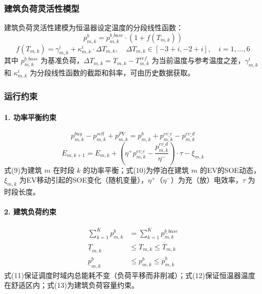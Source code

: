 \documentclass[11pt]{ctexart}
\begin{document}
\subsubsection{建筑负荷灵活性模型}

建筑负荷灵活性建模为恒温器设定温度的分段线性函数：
\begin{equation}
    p_{m,k}^b = p_{m,k}^{b\_base} \cdot (1 + f(T_{m,k}))
\end{equation}
\begin{equation}
    f(T_{m,k}) = \gamma_{m,k}^i + \kappa_{m,k}^i \cdot \Delta T_{m,k}, \quad \Delta T_{m,k} \in [-3+i, -2+i], \quad i=1,...,6
\end{equation}
其中 $p_{m,k}^{b\_base}$ 为基准负荷，$\Delta T_{m,k} = T_{m,k} - T_{m,k}^{ref}$ 为当前温度与参考温度之差，$\gamma_{m,k}^i$ 和 $\kappa_{m,k}^i$ 为分段线性函数的截距和斜率，可由历史数据获取。

\subsubsection{运行约束}

\paragraph{1. 功率平衡约束}
\begin{equation}
    p_{m,k}^{buy} - p_{m,k}^{sell} + p_{m,k}^{PV} = p_{m,k}^b + p_{m,k}^{ev\_c} - p_{m,k}^{ev\_d}
\end{equation}
\begin{equation}
    E_{m,k+1} = E_{m,k} + (\eta^+ p_{m,k}^{ev\_c} - \frac{p_{m,k}^{ev\_d}}{\eta^-}) \cdot \tau - \xi_{m,k}
\end{equation}
式(9)为建筑 $m$ 在时段 $k$ 的功率平衡；式(10)为停泊在建筑 $m$ 的EV的SOE动态，$\xi_{m,k}$ 为EV移动引起的SOE变化（随机变量），$\eta^+$（$\eta^-$）为充（放）电效率，$\tau$ 为时段长度。

\paragraph{2. 建筑负荷约束}
\begin{align}
    \sum_{k=1}^{K} p_{m,k}^b &= \sum_{k=1}^{K} p_{m,k}^{b\_base} \\
    \underline{T}_{m,k} &\le T_{m,k} \le \overline{T}_{m,k} \\
    \underline{p}_{m,k}^b &\le p_{m,k}^b \le \overline{p}_{m,k}^b
\end{align}
式(11)保证调度时域内总能耗不变（负荷平移而非削减）；式(12)保证恒温器温度在舒适区内；式(13)为建筑负荷容量约束。
\end{document}
